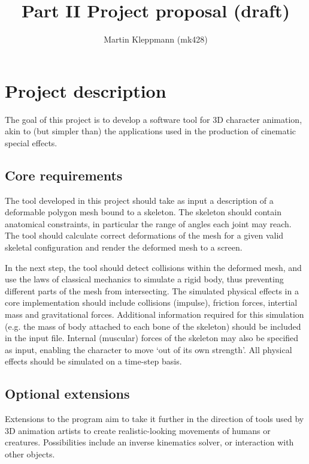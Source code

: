 \documentclass{article}
\begin{document}
\title{Part II Project proposal (draft)}
\author{Martin Kleppmann (mk428)}
\maketitle

\section*{Project description}

The goal of this project is to develop a software tool for 3D character
animation, akin to (but simpler than) the applications used in the
production of cinematic special effects.

\subsection*{Core requirements}

The tool developed in this project should take as input a description
of a deformable polygon mesh bound to a skeleton. The skeleton should
contain anatomical constraints, in particular the range of angles each
joint may reach. The tool should calculate correct deformations of the
mesh for a given valid skeletal configuration and render the deformed
mesh to a screen.

In the next step, the tool should detect collisions within the
deformed mesh, and use the laws of classical mechanics to simulate a
rigid body, thus preventing different parts of the mesh from
intersecting. The simulated physical effects in a core implementation
should include collisions (impulse), friction forces, intertial mass
and gravitational forces. Additional information required for this
simulation (e.g. the mass of body attached to each bone of the
skeleton) should be included in the input file. Internal (muscular)
forces of the skeleton may also be specified as input, enabling the
character to move `out of its own strength'. All physical effects
should be simulated on a time-step basis.


\subsection*{Optional extensions}

Extensions to the program aim to take it further in the direction of
tools used by 3D animation artists to create realistic-looking
movements of humans or creatures. Possibilities include an inverse
kinematics solver, or interaction with other objects.
\end{document}
